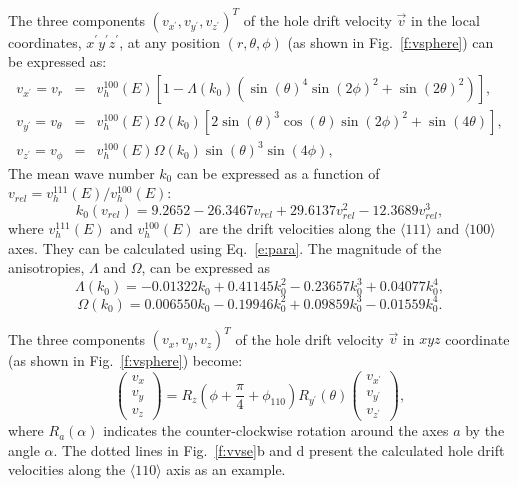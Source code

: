 \documentclass[epj]{svjour}
\begin{document}
The three components $(v_{x^{\prime}}, v_{y^{\prime}},
v_{z^{\prime}})^{T}$ of the hole drift velocity $\vec{v}$ in the
local coordinates, $x^{\prime}y^{\prime}z^{\prime}$, at any position
$(r, \theta, \phi)$ (as shown in Fig.~\ref{f:vsphere}) can be
expressed as:
\begin{equation} 
\label{e:vsphere} 
\begin{array}{rcl} 
v_{x^{\prime}} = v_{r} &=& v^{100}_{h}(E)
[1-\Lambda(k_{0})(\sin(\theta)^{4}\sin(2\phi)^{2} + \sin(2\theta)^{2})],\\ 
v_{y^{\prime}} = v_{\theta} &=& v^{100}_{h}(E)\Omega(k_{0})
[2\sin(\theta)^{3}\cos(\theta)\sin(2\phi)^{2} + \sin(4\theta)],\\ 
v_{z^{\prime}} = v_{\phi} &=& v^{100}_{h}(E)\Omega(k_{0})\sin(\theta)^{3}\sin(4\phi), 
\end{array} 
\end{equation} 
The mean wave number $k_{0}$ can be expressed as a function of
$v_{rel} = v^{111}_{h}(E)/v^{100}_{h}(E)$:
\begin{equation} 
\label{e:k0} 
k_{0}(v_{rel}) = 9.2652 - 26.3467v_{rel} + 29.6137v_{rel}^{2} - 12.3689v_{rel}^{3}, 
\end{equation} 
where $v^{111}_{h}(E)$ and $v^{100}_{h}(E)$ are the drift velocities
along the $\langle111\rangle$ and $\langle100\rangle$ axes. They can
be calculated using Eq.~\ref{e:para}. The magnitude of the
anisotropies, $\Lambda$ and $\Omega$, can be expressed as
\begin{equation} 
\label{e:lamb} 
\Lambda(k_{0}) = -0.01322k_{0} + 0.41145k_{0}^{2} - 0.23657k_{0}^{3} + 0.04077k_{0}^{4}, 
\end{equation} 
\begin{equation} 
\label{e:ome} 
\Omega(k_{0}) = 0.006550k_{0} - 0.19946k_{0}^{2} + 0.09859k_{0}^{3} - 0.01559k_{0}^{4}. 
\end{equation} 
 
The three components $(v_{x}, v_{y}, v_{z})^{T}$ of the hole drift
velocity $\vec{v}$ in $xyz$ coordinate (as shown in
Fig.~\ref{f:vsphere}) become:
\begin{equation} 
\label{e:v2v}   
\left( 
\begin{array}{c} 
v_{x} \\ v_{y} \\ v_{z} 
\end{array} 
\right) = R_{z}(\phi + \frac{\pi}{4} + \phi_{110}) R_{y^{\prime}}(\theta) \left(  
\begin{array}{c} 
v_{x^{\prime}} \\ v_{y^{\prime}} \\ v_{z^{\prime}} 
\end{array} \right), 
\end{equation} 
where $R_a(\alpha)$ indicates the counter-clockwise rotation around
the axes $a$ by the angle $\alpha$. The dotted lines in
Fig.~\ref{f:vvse}b and d present the calculated hole drift velocities
along the $\langle 110 \rangle$ axis as an example.
\end{document}

